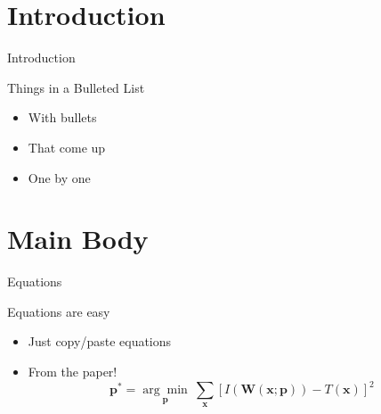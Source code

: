 \documentclass[a4paper, utf8]{beamer}
\begin{document}
\begin{frame}[plain]
  \titlepage
\end{frame}


\section
  {Introduction}

\makeatletter
\begin{frame}
  {Introduction}

  {Things in a Bulleted List}

  \pause

  \begin{itemize}
  \item With bullets\pause
  \item That come up\pause
  \item One by one
  \end{itemize}
\end{frame}
\makeatother


\section
  {Main Body}

\begin{frame}
  {Equations}

  Equations are easy
  \begin{itemize}
  \item Just copy/paste equations\pause
  \item From the paper!
    \begin{equation*}
      \textbf{p}^* = \underset{\textbf{p}}{\arg\!\min}~\sum_{\textbf{x}}\left[ I(\textbf{W}(\textbf{x};\textbf{p})) - T(\textbf{x}) \right]^2
    \end{equation*}
  \end{itemize}
\end{frame}
\end{document}
